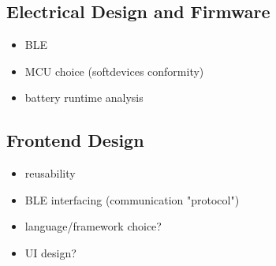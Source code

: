 \subsection{Electrical Design and Firmware}

\begin{itemize}
    \item BLE
    \item MCU choice (softdevices conformity)
    \item battery runtime analysis
\end{itemize}

\subsection{Frontend Design}

\begin{itemize}
    \item reusability
    \item BLE interfacing (communication "protocol")
    \item language/framework choice?
    \item UI design?
\end{itemize}
